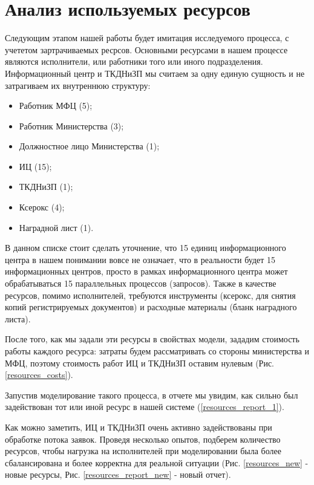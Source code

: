 \chapter{Анализ используемых ресурсов}

Следующим этапом нашей работы будет имитация исследуемого
процесса, с учететом зартрачиваемых ресрсов. Основными
ресурсами в нашем процессе являются исполнители, или
работники того или иного подразделения. Информационный
центр и ТКДНиЗП мы считаем за одну единую сущность и не
затрагиваем их внутреннюю структуру:

\begin{itemize}
    \item Работник МФЦ (5);
    \item Работник Министерства (3);
    \item Должностное лицо Министерства (1);
    \item ИЦ (15);
    \item ТКДНиЗП (1);
    \item Ксерокс (4);
    \item Наградной лист (1).
\end{itemize}

В данном списке стоит сделать уточнение, что 15 единиц
информационного центра в нашем понимании вовсе не означает,
что в реальности будет 15 информационных центров, просто
в рамках информационного центра может обрабатываться 15
параллельных процессов (запросов). Также в качестве ресурсов,
помимо исполнителей, требуются инструменты (ксерокс, для
снятия копий регистрируемых документов) и расходные
материалы (бланк наградного листа).

После того, как мы задали эти ресурсы в свойствах модели,
зададим  стоимость работы каждого ресурса: затраты будем
рассматривать со стороны министерства и МФЦ, поэтому
стоимость работ ИЦ и ТКДНиЗП оставим нулевым
(Рис. \ref{resources_costs}).

Запустив моделирование такого процесса, в отчете мы увидим,
как сильно был задействован тот или иной ресурс в нашей
системе (\ref{resources_report_1}).

\clearpage

Как можно заметить, ИЦ и ТКДНиЗП очень активно задействованы
при обработке потока заявок. Проведя несколько опытов,
подберем количество ресурсов, чтобы нагрузка на исполнителей
при моделировании была более сбалансирована и более корректна
для реальной ситуации (Рис. \ref{resources_new} - новые ресурсы,
Рис. \ref{resources_report_new} - новый отчет).


